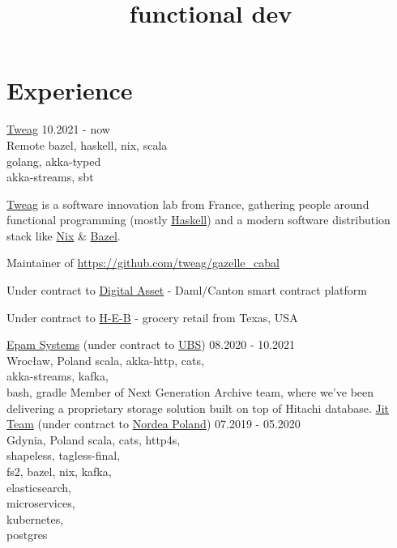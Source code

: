 \documentclass[a4paper,11pt]{cv4tw}%
\title{functional dev}
\begin{document}
\section{Experience}
      {\href{https://www.tweag.io}{Tweag}}
      {10.2021 - now\\Remote}
      {bazel, haskell, nix, scala\\golang, akka-typed\\akka-streams, sbt}
      { \href{tweag.io}{Tweag} is a software innovation lab from France, gathering people around
        functional programming (mostly \href{https://www.haskell.org}{Haskell}) and a modern
        software distribution stack like \href{https://nixos.org}{Nix} \& \href{https://bazel.build}{Bazel}.
        \begin{missions}
        \item Maintainer of \href{https://github.com/tweag/gazelle_cabal}{https://github.com/tweag/gazelle\_cabal}
        \item Under contract to \href{https://www.digitalasset.com}{Digital Asset} -
          Daml/Canton smart contract platform
        \item Under contract to \href{https://www.heb.com}{H-E-B} -
          grocery retail from Texas, USA
        \end{missions}
      }
      {\href{https://www.epam.com}{Epam Systems} (under contract to \href{https://www.ubs.com}{UBS})}
      {08.2020 - 10.2021\\Wrocław, Poland}
      {scala, akka-http, cats,\\akka-streams, kafka,\\bash, gradle}
      {Member of Next Generation Archive team, where we've been delivering a proprietary storage solution built on
        top of Hitachi database.
      }
      {\href{https://www.jit.team}{Jit Team} (under contract to \href{https://www.nordea.com}{Nordea Poland})}
      {07.2019 - 05.2020\\Gdynia, Poland}
      {scala, cats, http4s,\\shapeless, tagless-final,\\fs2, bazel, nix, kafka,\\elasticsearch,\\microservices,\\kubernetes,\\postgres
      }
\end{document}
